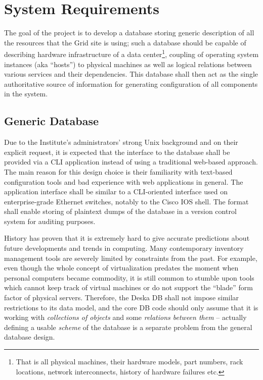 \documentclass{article}
\begin{document}
\section{System Requirements}

The goal of the project is to develop a database storing generic description of all the resources that the Grid site is using;
such a database should be capable of describing hardware infrastructure of a data center\footnote{That is all physical machines,
their hardware models, part numbers, rack locations, network interconnects, history of hardware failures etc.}, coupling of
operating system instances (aka ``hosts'') to physical machines as well as logical relations between various services and their
dependencies.  This database shall then act as the single authoritative source of information for generating configuration of all
components in the system.

\subsection{Generic Database}

Due to the Institute's administrators' strong Unix background and on their explicit request, it is expected that the interface to
the database shall be provided via a CLI application instead of using a traditional web-based approach.  The main reason for this
design choice is their familiarity with text-based configuration tools and bad experience with web applications in general.  The
application interface shall be similar to a CLI-oriented interface used on enterprise-grade Ethernet switches, notably to the
Cisco IOS shell.  The format shall enable storing of plaintext dumps of the database in a version control system for auditing
purposes.

History has proven that it is extremely hard to give accurate predictions about future developments and trends in computing.  Many
contemporary inventory management tools are severely limited by constraints from the past.  For example, even though the whole
concept of virtualization predates the moment when personal computers became commodity, it is still common to stumble upon tools
which cannot keep track of virtual machines or do not support the ``blade'' form factor of physical servers.  Therefore, the Deska
DB shall not impose similar restrictions to its data model, and the core DB code should only assume that it is working with {\em
collections of objects} and some {\em relations between them} -- actually defining a usable {\em scheme} of the database is a
separate problem from the general database design.
\end{document}
